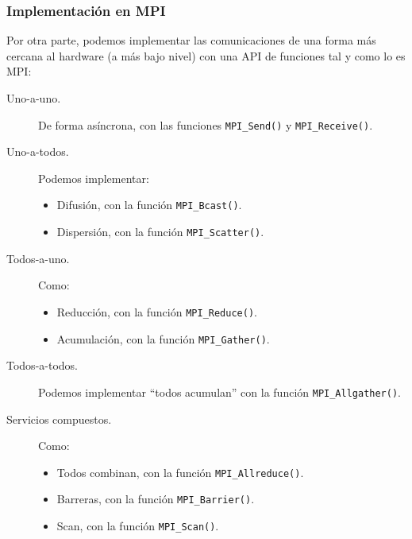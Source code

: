 \subsubsection{Implementación en MPI} 
Por otra parte, podemos implementar las comunicaciones de una forma más cercana al hardware (a más bajo nivel) con una API de funciones tal y como lo es MPI:
\begin{description}
    \item [Uno-a-uno.] De forma asíncrona, con las funciones \verb|MPI_Send()| y \verb|MPI_Receive()|.
    \item [Uno-a-todos.] Podemos implementar:
        \begin{itemize}
            \item Difusión, con la función \verb|MPI_Bcast()|.
            \item Dispersión, con la función \verb|MPI_Scatter()|.
        \end{itemize} 
    \item [Todos-a-uno.] Como:
        \begin{itemize}
            \item Reducción, con la función \verb|MPI_Reduce()|.
            \item Acumulación, con la función \verb|MPI_Gather()|.
        \end{itemize}
    \item [Todos-a-todos.] Podemos implementar ``todos acumulan'' con la función \verb|MPI_Allgather()|.
    \item [Servicios compuestos.] Como:
        \begin{itemize}
            \item Todos combinan, con la función \verb|MPI_Allreduce()|.
            \item Barreras, con la función \verb|MPI_Barrier()|.
            \item Scan, con la función \verb|MPI_Scan()|.
        \end{itemize}
\end{description}

